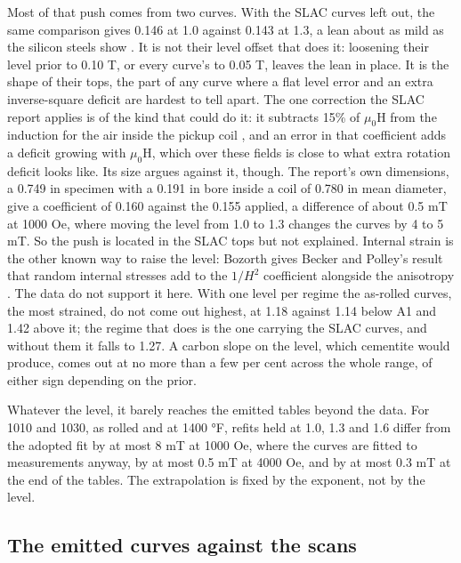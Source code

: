 \documentclass[
  11pt,
]{article}
\begin{document}
Most of that push comes from two curves. With the SLAC curves left out, the same comparison gives 0.146 at 1.0 against 0.143 at 1.3, a lean about as mild as the silicon steels show \cite{sicurves}. It is not their level offset that does it: loosening their level prior to 0.10 T, or every curve's to 0.05 T, leaves the lean in place. It is the shape of their tops, the part of any curve where a flat level error and an extra inverse-square deficit are hardest to tell apart. The one correction the SLAC report applies is of the kind that could do it: it subtracts 15\% of \(\mu_0\)H from the induction for the air inside the pickup coil \cite{cobb1989}, and an error in that coefficient adds a deficit growing with \(\mu_0\)H, which over these fields is close to what extra rotation deficit looks like. Its size argues against it, though. The report's own dimensions, a 0.749 in specimen with a 0.191 in bore inside a coil of 0.780 in mean diameter, give a coefficient of 0.160 against the 0.155 applied, a difference of about 0.5 mT at 1000 Oe, where moving the level from 1.0 to 1.3 changes the curves by 4 to 5 mT. So the push is located in the SLAC tops but not explained. Internal strain is the other known way to raise the level: Bozorth gives Becker and Polley's result that random internal stresses add to the \(1/H^{2}\) coefficient alongside the anisotropy \cite{bozorth1951}. The data do not support it here. With one level per regime the as-rolled curves, the most strained, do not come out highest, at 1.18 against 1.14 below A1 and 1.42 above it; the regime that does is the one carrying the SLAC curves, and without them it falls to 1.27. A carbon slope on the level, which cementite would produce, comes out at no more than a few per cent across the whole range, of either sign depending on the prior.

Whatever the level, it barely reaches the emitted tables beyond the data. For 1010 and 1030, as rolled and at 1400 °F, refits held at 1.0, 1.3 and 1.6 differ from the adopted fit by at most 8 mT at 1000 Oe, where the curves are fitted to measurements anyway, by at most 0.5 mT at 4000 Oe, and by at most 0.3 mT at the end of the tables. The extrapolation is fixed by the exponent, not by the level.

\subsection{The emitted curves against the scans}\label{the-emitted-curves-against-the-scans}
\end{document}
